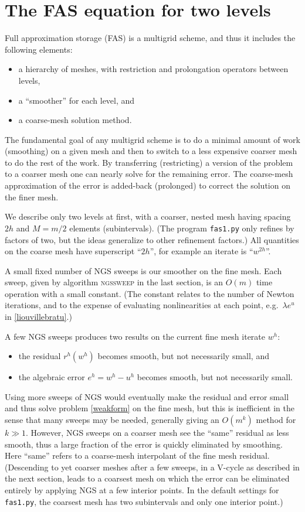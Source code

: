 \documentclass[letterpaper,final,12pt,reqno]{amsart}
\begin{document}
\section{The FAS equation for two levels}

Full approximation storage (FAS) \cite{Brandt1977,Briggsetal2000} is a multigrid scheme, and thus it includes the following elements:
\begin{itemize}
\item a hierarchy of meshes, with restriction and prolongation operators between levels,
\item a ``smoother'' for each level, and
\item a coarse-mesh solution method.
\end{itemize}
The fundamental goal of any multigrid scheme is to do a minimal amount of work (smoothing) on a given mesh and then to switch to a less expensive coarser mesh to do the rest of the work.  By transferring (restricting) a version of the problem to a coarser mesh one can nearly solve for the remaining error.  The coarse-mesh approximation of the error is added-back (prolonged) to correct the solution on the finer mesh.

We describe only two levels at first, with a coarser, nested mesh having spacing $2h$ and $M=m/2$ elements (subintervals).  (The program \texttt{fas1.py} only refines by factors of two, but the ideas generalize to other refinement factors.)  All quantities on the coarse mesh have superscript ``$2h$'', for example an iterate is ``$w^{2h}$''.

A small fixed number of NGS sweeps is our smoother on the fine mesh.  Each sweep, given by algorithm \textsc{ngssweep} in the last section, is an $O(m)$ time operation with a small constant.  (The constant relates to the number of Newton iterations, and to the expense of evaluating nonlinearities at each point, e.g.~$\lambda e^u$ in \eqref{liouvillebratu}.)

A few NGS sweeps produces two results on the current fine mesh iterate $w^h$:
\begin{itemize}
\item the residual $r^h(w^h)$ becomes smooth, but not necessarily small, and
\item the algebraic error $e^h = w^h - u^h$ becomes smooth, but not necessarily small.
\end{itemize}

Using more sweeps of NGS would eventually make the residual and error small and thus solve problem \eqref{weakform} on the fine mesh, but this is inefficient in the sense that many sweeps may be needed, generally giving an $O(m^k)$ method for $k\gg 1$.  However, NGS sweeps on a coarser mesh see the ``same'' residual as less smooth, thus a large fraction of the error is quickly eliminated by smoothing.  Here ``same'' refers to a coarse-mesh interpolant of the fine mesh residual.  (Descending to yet coarser meshes after a few sweeps, in a V-cycle as described in the next section, leads to a coarsest mesh on which the error can be eliminated entirely by applying NGS at a few interior points.  In the default settings for \texttt{fas1.py}, the coarsest mesh has two subintervals and only one interior point.)
\end{document}
